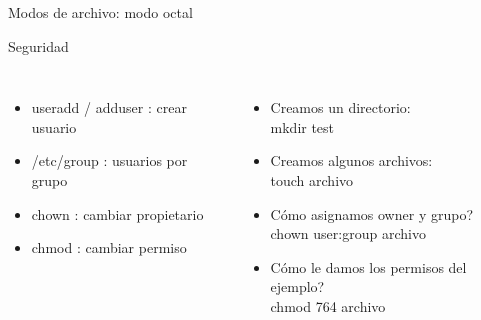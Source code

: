 \begin{frame}{Modos de archivo: modo octal}
\begin{center}
 {
} {
} {
}
\end{center}
\end{frame}


\begin{frame}{Seguridad}
\bigskip
\begin{columns}[onlytextwidth]
	 {
		\begin{itemize}
			\item \alert{ useradd / adduser }: crear usuario
			\item \alert{ /etc/group }: usuarios por grupo
			\item \alert{ chown }: cambiar propietario
			\item \alert{ chmod }: cambiar permiso
		\end{itemize}
	}  {
		\begin{itemize}
			\item Creamos un directorio: \\
			        \alert{mkdir test}
			\item Creamos algunos archivos: \\
			        \alert{touch archivo}
			\item \textquestiondown C\'omo asignamos owner y grupo? \\
			        \alert{chown user:group archivo}
			\item \textquestiondown C\'omo le damos los permisos del ejemplo? \\
			        \alert{chmod 764 archivo}
		\end{itemize}
	}
\end{columns}
\end{frame}


